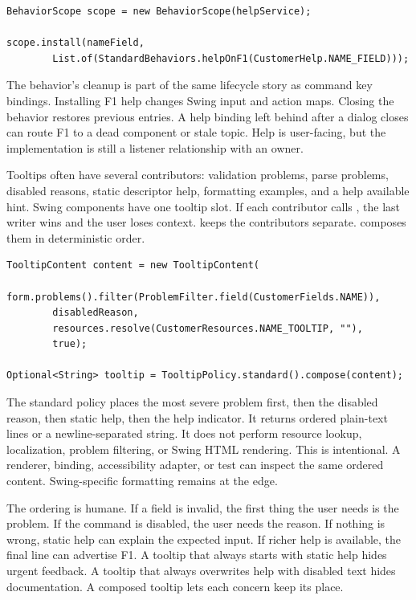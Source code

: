 \begin{lstlisting}[caption={Help behavior is metadata plus reversible Swing wiring.}]
BehaviorScope scope = new BehaviorScope(helpService);

scope.install(nameField,
        List.of(StandardBehaviors.helpOnF1(CustomerHelp.NAME_FIELD)));
\end{lstlisting}

The behavior's cleanup is part of the same lifecycle story as command key
bindings. Installing F1 help changes Swing input and action maps. Closing the
behavior restores previous entries. A help binding left behind after a dialog
closes can route F1 to a dead component or stale topic. Help is user-facing,
but the implementation is still a listener relationship with an owner.

Tooltips often have several contributors: validation problems, parse problems,
disabled reasons, static descriptor help, formatting examples, and a help
available hint. Swing components have one tooltip slot. If each contributor
calls , the last writer wins and the user loses context.
 keeps the contributors separate. 
composes them in deterministic order.

\begin{lstlisting}[caption={Composing tooltip text from several concerns.}]
TooltipContent content = new TooltipContent(
        form.problems().filter(ProblemFilter.field(CustomerFields.NAME)),
        disabledReason,
        resources.resolve(CustomerResources.NAME_TOOLTIP, ""),
        true);

Optional<String> tooltip = TooltipPolicy.standard().compose(content);
\end{lstlisting}

The standard policy places the most severe problem first, then the disabled
reason, then static help, then the help indicator. It returns ordered
plain-text lines or a newline-separated string. It does not perform resource
lookup, localization, problem filtering, or Swing HTML rendering. This is
intentional. A renderer, binding, accessibility adapter, or test can inspect
the same ordered content. Swing-specific formatting remains at the edge.

The ordering is humane. If a field is invalid, the first thing the user needs
is the problem. If the command is disabled, the user needs the reason. If
nothing is wrong, static help can explain the expected input. If richer help is
available, the final line can advertise F1. A tooltip that always starts with
static help hides urgent feedback. A tooltip that always overwrites help with
disabled text hides documentation. A composed tooltip lets each concern keep
its place.


